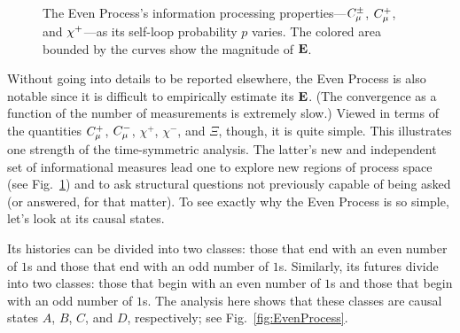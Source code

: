\begin{figure}[th]
\centering
{}
\caption{The Even Process's information processing properties---$C_\mu^{\pm}$,
  $C_\mu^{+}$, and $\chi^+$---as its self-loop probability $p$ varies.
  The colored area bounded by the curves show the magnitude of ${\bf E}$.
  }
\label{fig:EP_info}
\end{figure}

Without going into details to be reported elsewhere, the Even Process is also
notable since it is difficult to empirically estimate its ${\bf E}$.
(The convergence as a function of the number of measurements is extremely slow.)
Viewed in terms of the quantities $C_\mu^{+}$, $C_\mu^{-}$, $\chi^+$, $\chi^-$,
and $\Xi$, though, it is quite simple. This illustrates one strength of the
time-symmetric analysis. The latter's new and independent set of informational
measures lead one to explore new regions of process space 
(see Fig.~\ref{fig:EP_info}) and to ask structural questions
not previously capable of being asked (or answered, for that matter). To see
exactly why the Even Process is so simple, let's look at its causal states.

Its histories can be divided into two classes: those that end with an even
number of $1$s and those that end with an odd number of $1$s. Similarly, its
futures divide into two classes: those that begin with an even number of $1$s
and those that begin with an odd number of $1$s. The analysis here shows that
these classes are causal states $A$, $B$, $C$, and $D$, respectively; see
Fig.~\ref{fig:EvenProcess}.

